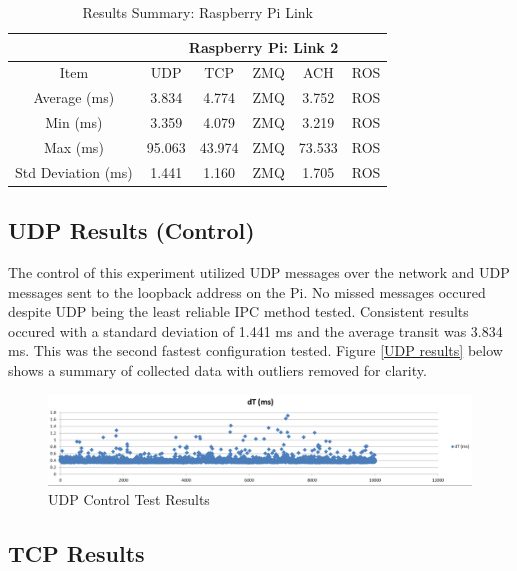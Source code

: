 \begin{table}[h]
\caption{Results Summary: Raspberry Pi Link}
\label{table:results summary rpi}
\begin{center}
\begin{tabular}{c|c||c||c||c||c|}
\cline{2-6}
& \multicolumn{5}{c|}{Raspberry Pi: Link 2}\\
\hline
\multicolumn{1}{|c|}{Item} & UDP & TCP & ZMQ & ACH  & ROS\\
\hline
\multicolumn{1}{|c|}{Average (ms)} & 3.834 & 4.774 & ZMQ & 3.752 & ROS\\
\hline
\multicolumn{1}{|c|}{Min (ms)} & 3.359 & 4.079 & ZMQ & 3.219 & ROS\\
\hline
\multicolumn{1}{|c|}{Max (ms)} & 95.063 & 43.974 & ZMQ & 73.533 & ROS\\
\hline
\multicolumn{1}{|c|}{Std Deviation (ms)} & 1.441 & 1.160 & ZMQ & 1.705 & ROS\\
\hline
\end{tabular}
\end{center} 
\end{table}

\subsection{UDP Results (Control)}

The control of this experiment utilized UDP messages over the network and UDP messages sent to the loopback address on the Pi. No missed messages occured despite UDP being the least reliable IPC method tested. Consistent results occured with a standard deviation of 1.441 ms and the average transit was 3.834 ms. This was the second fastest configuration tested. Figure \ref{UDP results} below shows a summary of collected data with outliers removed for clarity.

\begin{figure}[thpb]
 \centering
 \includegraphics[width=1.0\columnwidth]{./images/udp2udp.png}
  \caption{UDP Control Test Results}  
  \label{fig:UDP results}
\end{figure} 

\subsection{TCP Results}


